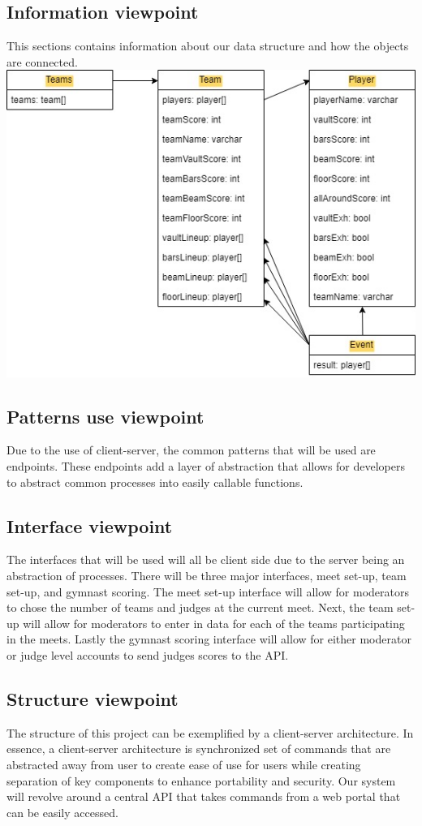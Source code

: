 \documentclass[letterpaper,10pt,draftclsnofoot,onecolumn,]{article}
\begin{document}
\subsection{Information viewpoint}
This sections contains information about our data structure and how the objects are connected.\\ \newline
\includegraphics[width=\textwidth,height=\textheight,keepaspectratio]{informationdiagram}
\subsection{Patterns use viewpoint}
Due to the use of client-server, the common patterns that will be used are endpoints. These endpoints add a layer of abstraction that allows for developers to abstract common processes into easily callable functions.
\subsection{Interface viewpoint}
The interfaces that will be used will all be client side due to the server being an abstraction of processes. There will be three major interfaces, meet set-up, team set-up, and gymnast scoring. The meet set-up interface will allow for moderators to chose the number of teams and judges at the current meet. Next, the team set-up will allow for moderators to enter in data for each of the teams participating in the meets. Lastly the gymnast scoring interface will allow for either moderator or judge level accounts to send judges scores to the API.
\subsection{Structure viewpoint}
The structure of this project can be exemplified by a client-server architecture. In essence, a client-server architecture is synchronized set of commands that are abstracted away from user to create ease of use for users while creating separation of key components to enhance portability and security. Our system will revolve around a central API that takes commands from a web portal that can be easily accessed.
\end{document}
